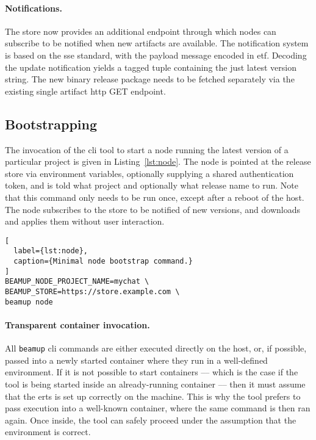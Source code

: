 \paragraph{Notifications.} The store now provides an additional endpoint through which nodes can subscribe to be notified when new artifacts are available. The notification system is based on the \acrfull{sse} standard, with the payload message encoded in \acrfull{etf}. Decoding the update notification yields a tagged tuple containing the just latest version string. The new binary release package needs to be fetched separately via the existing single artifact \acrshort{http} GET endpoint.



\subsection{Bootstrapping}
The invocation of the \acrshort{cli} tool to start a node running the latest version of a particular project is given in Listing~\ref{lst:node}. The node is pointed at the release store via environment variables, optionally supplying a shared authentication token, and is told what project and optionally what release name to run. Note that this command only needs to be run once, except after a reboot of the host. The node subscribes to the store to be notified of new versions, and downloads and applies them without user interaction.

\begin{lstlisting}[
  label={lst:node},
  caption={Minimal node bootstrap command.}
]
BEAMUP_NODE_PROJECT_NAME=mychat \
BEAMUP_STORE=https://store.example.com \
beamup node
\end{lstlisting}

\paragraph{Transparent container invocation.}
All \lstinline|beamup| \acrshort{cli} commands are either executed directly on the host, or, if possible, passed into a newly started container where they run in a well-defined environment. If it is not possible to start containers –– which is the case if the tool is being started inside an already-running container –– then it must assume that the \acrshort{erts} is  set up correctly on the machine. This is why the tool prefers to pass execution into a well-known container, where the same command is then ran again. Once inside, the tool can safely proceed under the assumption that the environment is correct.~\cite{zak18}


